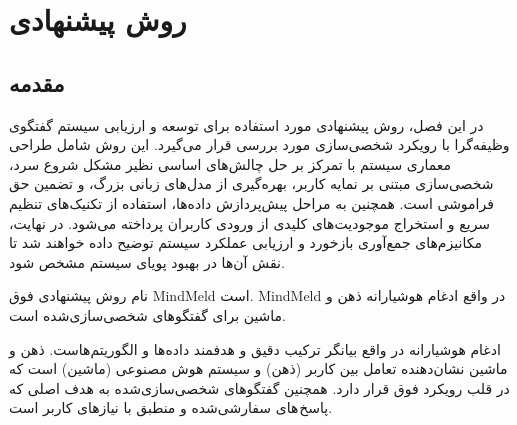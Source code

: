 \chapter{روش پیشنهادی}
\section{مقدمه} 
در این فصل، روش پیشنهادی مورد استفاده برای توسعه و ارزیابی سیستم گفتگوی وظیفه‌گرا با رویکرد شخصی‌سازی مورد بررسی قرار می‌گیرد. این روش شامل طراحی معماری سیستم با تمرکز بر حل چالش‌های اساسی نظیر مشکل شروع سرد، شخصی‌سازی مبتنی بر نمایه کاربر، بهره‌گیری از مدل‌های زبانی بزرگ، و تضمین حق فراموشی است. 
همچنین به مراحل پیش‌پردازش داده‌ها، استفاده از تکنیک‌های تنظیم سریع و استخراج موجودیت‌های کلیدی از ورودی کاربران پرداخته می‌شود. در نهایت، مکانیزم‌های جمع‌آوری بازخورد و ارزیابی عملکرد سیستم توضیح داده خواهند شد تا نقش آن‌ها در بهبود پویای سیستم مشخص شود.

نام روش پیشنهادی فوق MindMeld است. MindMeld در واقع ادغام هوشیارانه ذهن و ماشین برای گفتگوهای شخصی‌سازی‌شده است.


ادغام هوشیارانه در واقع بیانگر ترکیب دقیق و هدفمند داده‌ها و الگوریتم‌هاست. ذهن و ماشین نشان‌دهنده تعامل بین کاربر (ذهن) و سیستم هوش مصنوعی (ماشین) است که در قلب رویکرد فوق قرار دارد. همچنین گفتگوهای شخصی‌سازی‌شده به هدف اصلی که پاسخ های سفارشی‌شده و منطبق با نیازهای کاربر است.

